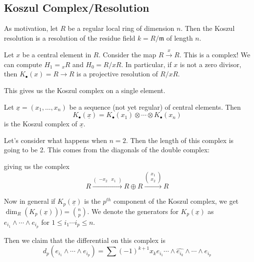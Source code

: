 \documentclass[12pt]{article}
\begin{document}
\subsection{Koszul Complex/Resolution}
As motivation, let $R$ be a regular local ring of dimension $n$. Then the Koszul resolution is a resolution of the 
residue field $k=R/\mathfrak{m}$ of length $n$.

\begin{ex}
	Let $x$ be a central element in $R$. Consider the map $R\xrightarrow{x}R$. This is a complex! We can compute 
	$H_1={_x}R$ and $H_0=R/xR$. In particular, if $x$ is not a zero divisor, then $K_\bullet(x)=R\to R$ is a 
	projective resolution of $R/xR$.

	This gives us the Koszul complex on a single element.
\end{ex}

\begin{defn}
	Let $\underline x=(x_1,\dots,x_n)$ be a sequence (not yet regular) of central elements. Then 
	\[K_\bullet(\underline{x})=K_\bullet(x_1)\otimes\cdots\otimes K_\bullet(x_n)\]
	is the Koszul complex of $\underline{x}$.
\end{defn}
\begin{ex}
	Let's consider what happens when $n=2$. Then the length of this complex is going to be 2. This comes 
	from the diagonals of the double complex:
	\begin{center}
	\end{center}
	giving us the complex 
\[R\xrightarrow{\begin{pmatrix}-x_2 & x_1\end{pmatrix}} R\oplus R\xrightarrow{\begin{pmatrix}x_1\\x_2\end{pmatrix}} R\]
\end{ex}

Now in general if $K_p(\underline{x})$ is the $p^{th}$ component of the Koszul complex, we get $\dim_R(K_p(\underline{x})))=\binom{n}{p}$.
We denote the generators for $K_p(\underline{x})$ as $e_{i_1}\wedge\cdots\wedge e_{i_p}$ for $1\le i_1\cdots i_p\le n$.

Then we claim that the differential on this complex is 
\[d_p(e_{i_1}\wedge \cdots\wedge e_{i_p})=\sum (-1)^{k+1}x_k e_{i_1}\cdots\wedge \widehat{e_{i_k}}\wedge\cdots\wedge e_{i_p}\]
\end{document}
